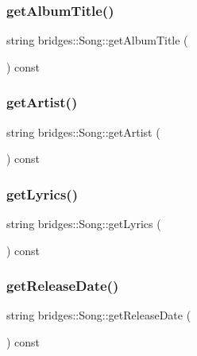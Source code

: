 \subsubsection{\texorpdfstring{get\+Album\+Title()}{getAlbumTitle()}}
{\footnotesize\ttfamily string bridges\+::\+Song\+::get\+Album\+Title (\begin{DoxyParamCaption}{ }\end{DoxyParamCaption}) const\hspace{0.3cm}{\ttfamily [inline]}}

\mbox{\label{classbridges_1_1_song_a22175397f3ca65470d4c7081a3d37a13}} 
\subsubsection{\texorpdfstring{get\+Artist()}{getArtist()}}
{\footnotesize\ttfamily string bridges\+::\+Song\+::get\+Artist (\begin{DoxyParamCaption}{ }\end{DoxyParamCaption}) const\hspace{0.3cm}{\ttfamily [inline]}}

\mbox{\label{classbridges_1_1_song_a54a6ce44a8b553527ba7cb0f8521fb7f}} 
\subsubsection{\texorpdfstring{get\+Lyrics()}{getLyrics()}}
{\footnotesize\ttfamily string bridges\+::\+Song\+::get\+Lyrics (\begin{DoxyParamCaption}{ }\end{DoxyParamCaption}) const\hspace{0.3cm}{\ttfamily [inline]}}

\mbox{\label{classbridges_1_1_song_a0504614f584d42624888caf74cf45060}} 
\subsubsection{\texorpdfstring{get\+Release\+Date()}{getReleaseDate()}}
{\footnotesize\ttfamily string bridges\+::\+Song\+::get\+Release\+Date (\begin{DoxyParamCaption}{ }\end{DoxyParamCaption}) const\hspace{0.3cm}{\ttfamily [inline]}}

